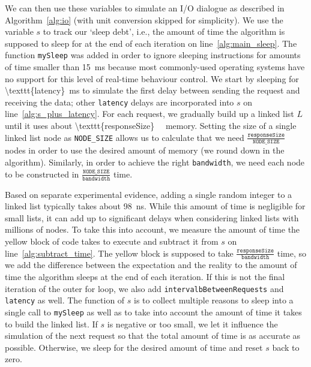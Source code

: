 \documentclass{article}
\begin{document}
We can then use these variables to simulate an I/O dialogue as described in
Algorithm~\ref{alg:io} (with unit conversion skipped for
simplicity). We use the variable $s$ to track our `sleep debt', i.e., the amount
of time the algorithm is supposed to sleep for at the end of each iteration on
line~\ref{alg:main_sleep}. The function \texttt{mySleep} was added in order to
ignore sleeping instructions for amounts of time smaller than
\SI{15}{\milli\second} because most commonly-used operating systems have no
support for this level of real-time behaviour control. We start by sleeping for
\SI[number-math-rm=\mathnormal,parse-numbers=false]{\texttt{latency}}{\milli\second}
to simulate the first delay between sending the request and receiving the data;
other \texttt{latency} delays are incorporated into $s$ on
line~\ref{alg:s_plus_latency}. For each request, we gradually build up a linked
list $L$ until it uses about
\SI[number-math-rm=\mathnormal,parse-numbers=false]{\texttt{responseSize}}{\kibi\byte}
memory. Setting the size of a single linked list node as \texttt{NODE\_SIZE}
allows us to calculate that we need
$\frac{\texttt{responseSize}}{\texttt{NODE\_SIZE}}$ nodes in order to use the
desired amount of memory (we round down in the algorithm). Similarly, in order
to achieve the right \texttt{bandwidth}, we need each node to be constructed in
$\frac{\texttt{NODE\_SIZE}}{\texttt{bandwidth}}$ time.

Based on separate experimental evidence, adding a single random integer to a
linked list typically takes about \SI{98}{\nano\second}. While this amount of
time is negligible for small lists, it can add up to significant delays when
considering linked lists with millions of nodes. To take this into account, we
measure the amount of time the yellow block of code takes to execute and
subtract it from $s$ on line~\ref{alg:subtract_time}. The yellow block is
supposed to take $\frac{\texttt{responseSize}}{\texttt{bandwidth}}$ time, so we
add the difference between the expectation and the reality to the amount of time
the algorithm sleeps at the end of each iteration. If this is not the final
iteration of the outer for loop, we also add \texttt{intervalbBetweenRequests}
and \texttt{latency} as well. The function of $s$ is to collect multiple
reasons to sleep into a single call to \texttt{mySleep} as well as to take into
account the amount of time it takes to build the linked list. If $s$ is negative
or too small, we let it influence the simulation of the next request so that the
total amount of time is as accurate as possible. Otherwise, we sleep for the
desired amount of time and reset $s$ back to zero.
\end{document}
